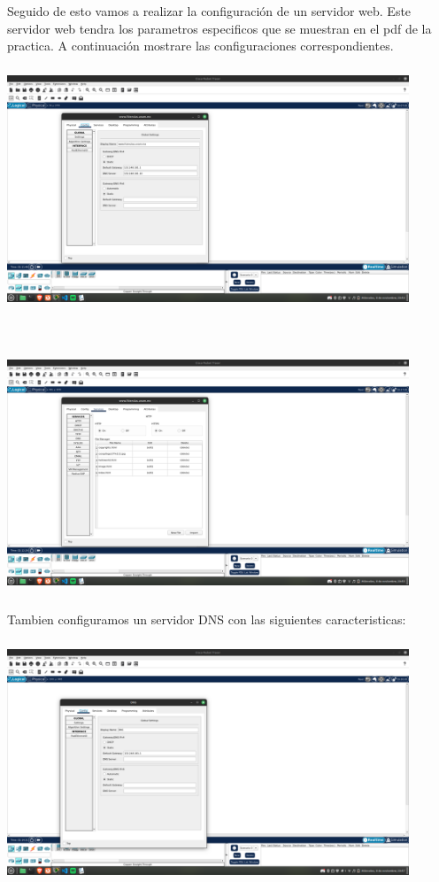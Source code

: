 \documentclass[14pt]{book}
\begin{document}
Seguido de esto vamos a realizar la configuración de un servidor web.
Este servidor web tendra los parametros especificos que se muestran en el pdf de la practica. A continuación mostrare las configuraciones correspondientes.\\

\includegraphics[width=12cm, height=8cm]{images/ima5.png}

\includegraphics[width=12cm, height=8cm]{images/ima6.png}\\

Tambien configuramos un servidor DNS con las siguientes caracteristicas:\\

\includegraphics[width=12cm, height=8cm]{images/ima7.png}
\end{document}
